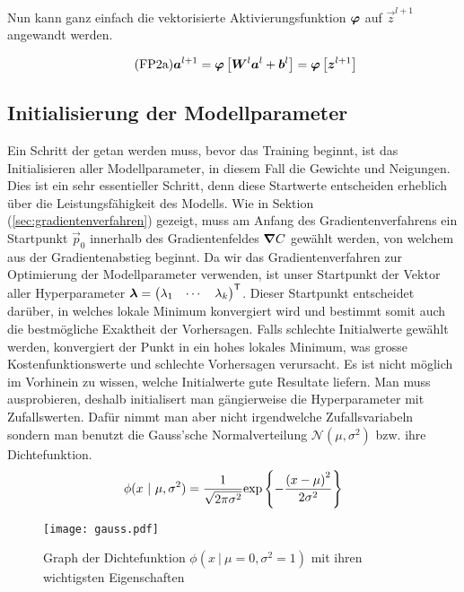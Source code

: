Nun kann ganz einfach die vektorisierte Aktivierungsfunktion $\bm{\varphi}$ auf
$\vec{z}^{l+1}$ angewandt werden.

\begin{equation}\tag{FP2a}\label{eq:aktivierung_matrix}
  \bm{a}^{l+1} = \bm{\varphi} \left[\bm{W}^{l} \bm{a}^{l} + \bm{b}^{l} \right] = \bm{\varphi} \left[ \bm{z}^{l+1} \right]
\end{equation}

\para{}
\cite{Nielsen}

\subsection{Initialisierung der Modellparameter}\label{sec:parameter_initalisieren}
Ein Schritt der getan werden muss, bevor das Training beginnt, ist das
Initialisieren aller Modellparameter, in diesem Fall die Gewichte und Neigungen.
Dies ist ein sehr essentieller Schritt, denn diese Startwerte entscheiden
erheblich über die Leistungsfähigkeit des Modells.
\para{}
Wie in Sektion (\ref{sec:gradientenverfahren}) gezeigt, muss am Anfang des
Gradientenverfahrens ein Startpunkt $\vec{p}_0$ innerhalb des Gradientenfeldes
$\bm{\nabla}C$ gewählt werden, von welchem aus der Gradientenabstieg beginnt.
Da wir das Gradientenverfahren zur Optimierung der Modellparameter verwenden,
ist unser Startpunkt der Vektor aller Hyperparameter
$\bm{\lambda} = \begin{pmatrix} \lambda_1 & \cdots & \lambda_k \end{pmatrix}^{\mathsf{T}}$.
Dieser Startpunkt entscheidet darüber, in welches lokale Minimum konvergiert
wird und bestimmt somit auch die bestmögliche Exaktheit der Vorhersagen. Falls
schlechte Initialwerte gewählt werden, konvergiert der Punkt in ein hohes lokales
Minimum, was grosse Kostenfunktionswerte und schlechte Vorhersagen verursacht.
\para{}
Es ist nicht möglich im Vorhinein zu wissen, welche Initialwerte gute Resultate
liefern. Man muss ausprobieren, deshalb initialisert man gängierweise die
Hyperparameter mit Zufallswerten. Dafür nimmt man aber nicht irgendwelche
Zufallsvariabeln sondern man benutzt die Gauss'sche Normalverteilung
$\mathcal{N}(\mu,\sigma^2)$ bzw. ihre Dichtefunktion.
\[\ds \phi(x\ |\ \mu,\sigma^2) = \frac{1}{\sqrt{2\pi\sigma^2}} \text{exp} \left\{-\frac{{(x-\mu)}^2}{2\sigma^2}\right\} \]
\para{}
\begin{figure}[h!]
  \centering
  \texttt{[image: gauss.pdf]}
  \caption{Graph der Dichtefunktion $\phi(x\ |\ \mu=0,\sigma^2=1)$ mit ihren
    wichtigsten Eigenschaften}%
\end{figure}
